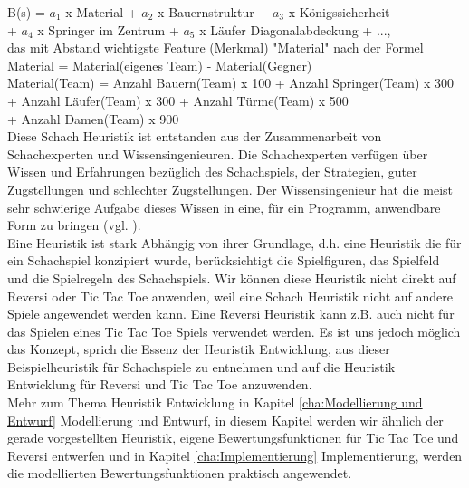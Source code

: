 B(s) = $a_1$ x Material +  $a_2$ x Bauernstruktur + $a_3$ x Königssicherheit \\
\tab \tab + $a_4$ x Springer im Zentrum + $a_5$ x Läufer Diagonalabdeckung + ..., \\ 

das mit Abstand wichtigste Feature (Merkmal) "Material" nach der Formel \\

\tab \tab Material = Material(eigenes Team) - Material(Gegner) \\

Material(Team) = Anzahl Bauern(Team) x 100 + Anzahl Springer(Team) x 300 \\
\tab \tab \tab + Anzahl Läufer(Team) x 300 + Anzahl Türme(Team) x 500 \\
\tab \tab \tab + Anzahl Damen(Team) x 900 \\

Diese Schach Heuristik ist entstanden aus der Zusammenarbeit von Schachexperten und Wissensingenieuren. Die Schachexperten verfügen über Wissen und Erfahrungen bezüglich des Schachspiels, der Strategien, guter Zugstellungen und schlechter Zugstellungen. Der Wissensingenieur hat die meist sehr schwierige Aufgabe dieses Wissen in eine, für ein Programm, anwendbare Form zu bringen (vgl. \cite[118]{Ertel}). \\

Eine Heuristik ist stark Abhängig von ihrer Grundlage, d.h. eine Heuristik die für ein Schachspiel konzipiert wurde, berücksichtigt die Spielfiguren, das Spielfeld und die Spielregeln des Schachspiels. Wir können diese Heuristik nicht direkt auf Reversi oder Tic Tac Toe anwenden, weil eine Schach Heuristik nicht auf andere Spiele angewendet werden kann. Eine Reversi Heuristik kann z.B. auch nicht für das Spielen eines Tic Tac Toe Spiels verwendet werden. Es ist uns jedoch möglich das Konzept, sprich die Essenz der Heuristik Entwicklung, aus dieser Beispielheuristik für Schachspiele zu entnehmen und auf die Heuristik Entwicklung für Reversi und Tic Tac Toe anzuwenden. \\

Mehr zum Thema Heuristik Entwicklung in Kapitel \ref{cha:Modellierung und Entwurf} Modellierung und Entwurf, in diesem Kapitel werden wir ähnlich der gerade vorgestellten Heuristik, eigene Bewertungsfunktionen für Tic Tac Toe und Reversi entwerfen und in Kapitel \ref{cha:Implementierung} Implementierung, werden die modellierten Bewertungsfunktionen praktisch angewendet. \\
